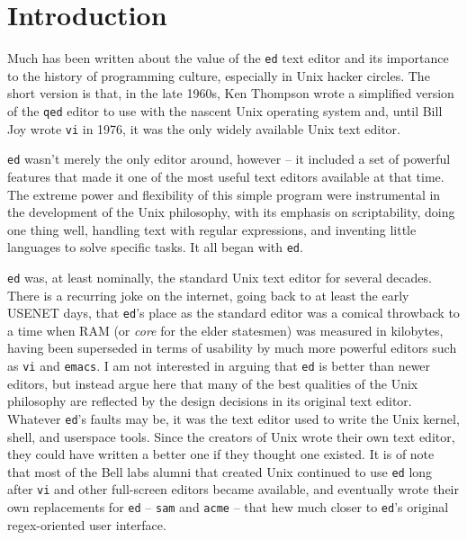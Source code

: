 \documentclass[12pt]{article}
\begin{document}
\maketitle


\section{Introduction}

Much has been written about the value of the \lstinline{ed} text editor
and its importance to the history of programming culture, especially
in Unix hacker circles. The short version is that, in the late 1960s,
Ken Thompson wrote a simplified version of the \lstinline{qed} editor
to use with the nascent Unix operating system and, until Bill Joy
wrote \lstinline{vi} in 1976, it was the only widely available Unix
text editor.

\lstinline{ed} wasn't merely the only editor around, however --
it included a set of powerful features
that made it one of the most useful text editors available at
that time. The extreme power and flexibility of this simple
program were instrumental in the development of the Unix philosophy,
with its emphasis on scriptability, doing one thing well, handling
text with regular expressions, and inventing little languages
to solve specific tasks. It all began with \lstinline{ed}.

\lstinline{ed} was, at least nominally, the standard Unix text editor
for several decades.
There is a recurring joke on the internet, going back to at least the early
USENET days,
that \lstinline{ed}'s place as the standard editor was a comical throwback
to a time when RAM (or \emph{core} for the elder statesmen) was measured
in kilobytes, having been superseded in terms of usability by much more
powerful editors such as \lstinline{vi} and \lstinline{emacs}.
I am not interested in arguing that \lstinline{ed} is better
than newer editors, but instead argue here that many of the
best qualities of the Unix philosophy are reflected by the design decisions
in its original text editor.
Whatever \lstinline{ed}'s faults may be, it was the text editor used to write
the Unix kernel, shell, and userspace tools. Since the creators of Unix
wrote their own text editor, they could have written a better one if they thought one existed. It is
of note that most of the Bell labs alumni that created Unix continued
to use \lstinline{ed} long after \lstinline{vi} and other full-screen editors
became available, and eventually wrote their own replacements for \lstinline{ed} --
\lstinline{sam} and \lstinline{acme} -- that hew much closer to \lstinline{ed}'s
original regex-oriented user interface.
\end{document}
